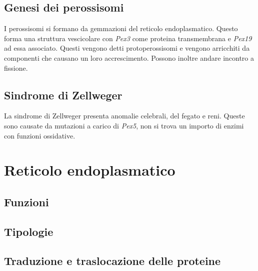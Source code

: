 	\subsection{Genesi dei perossisomi}
	I perossisomi si formano da gemmazioni del reticolo endoplasmatico.
	Questo forma una struttura vescicolare con \emph{Pex3} come proteina transmembrana e \emph{Pex19} ad essa associato.
	Questi vengono detti protoperossisomi e vengono arricchiti da componenti che causano un loro accrescimento.
	Possono inoltre andare incontro a fissione.

	\subsection{Sindrome di Zellweger}
	La sindrome di Zellweger presenta anomalie celebrali, del fegato e reni.
	Queste sono causate da mutazioni a carico di \emph{Pex5}, non si trova un importo di enzimi con funzioni ossidative.

\section{Reticolo endoplasmatico}

	\subsection{Funzioni}

	\subsection{Tipologie}

	\subsection{Traduzione e traslocazione delle proteine}
